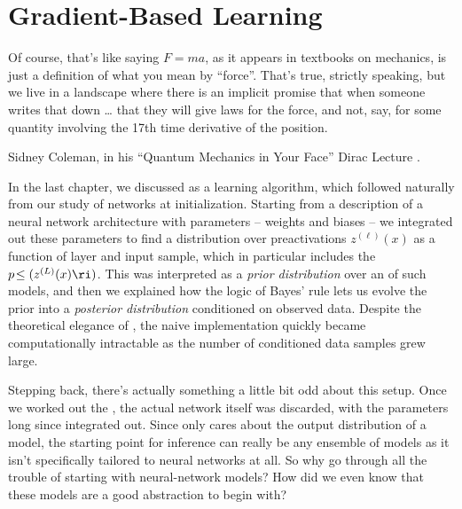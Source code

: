 
\chapter{Gradient-Based Learning}
\label{ch:training}

\epigraph{%
Of course, that’s like saying  $F = ma$, as it appears in textbooks on mechanics, is just a definition of what you mean by ``force''.  That’s true, strictly speaking, but we live in a landscape where there is an implicit promise that when someone writes that down \dots
that they will give laws for the force, and not, say, for some quantity involving the 17th time derivative of the position.}{Sidney Coleman, in his ``Quantum Mechanics in Your Face'' Dirac Lecture \cite{Coleman:2020put}.}


\noindent{}In the last chapter, we discussed  as a learning algorithm, which followed naturally from our study of networks at initialization. Starting from a description of a neural network architecture with parameters -- weights and biases -- we integrated out these parameters to find a distribution over preactivations $z^{(\ell)}(x)$ as a function of layer and input sample, which in particular includes the  $p\!\le(z^{(L)}(x) \ri)$. %
This was interpreted as a \emph{prior distribution} over an  of such models, and then we explained how the logic of Bayes' rule lets us evolve the prior into a \emph{posterior distribution} conditioned on observed data. Despite the theoretical elegance of , the naive implementation quickly became computationally intractable as the number of conditioned data samples grew large.

Stepping back, there's actually something a little bit odd about this setup. Once we worked out the , the actual network itself was discarded, with the parameters long since integrated out. Since  only cares about the output distribution of a model, the starting point for inference can really be any ensemble of models as it isn't specifically tailored to neural networks at all. So why go through all the trouble of starting with neural-network models? How did we even know that these models are a good abstraction to begin with?

